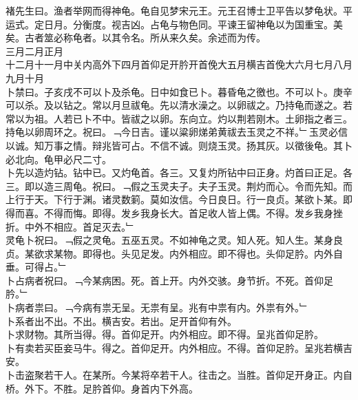 \documentclass{zhvt-classic}
\begin{document}
\hspace*{2em}褚先生曰。渔者举网而得神龟。龟自见梦宋元王。元王召博士卫平告以梦龟状。平运式。定日月。分衡度。视吉凶。占龟与物色同。平谏王留神龟以为国重宝。美矣。古者筮必称龟者。以其令名。所从来久矣。余述而为传。\\
\hspace*{2em}三月二月正月\\
\hspace*{2em}十二月十一月中关内高外下四月首仰足开肣开首俛大五月横吉首俛大六月七月八月九月十月\\
\hspace*{2em}卜禁曰。子亥戌不可以卜及杀龟。日中如食已卜。暮昏龟之徼也。不可以卜。庚辛可以杀。及以钻之。常以月旦祓龟。先以清水澡之。以卵祓之。乃持龟而遂之。若常以为祖。人若已卜不中。皆祓之以卵。东向立。灼以荆若刚木。土卵指之者三。持龟以卵周环之。祝曰。﹁今日吉。谨以粱卵焍弟黄祓去玉灵之不祥。﹂玉灵必信以诚。知万事之情。辩兆皆可占。不信不诚。则烧玉灵。扬其灰。以徵後龟。其卜必北向。龟甲必尺二寸。\\
\hspace*{2em}卜先以造灼钻。钻中已。又灼龟首。各三。又复灼所钻中曰正身。灼首曰正足。各三。即以造三周龟。祝曰。﹁假之玉灵夫子。夫子玉灵。荆灼而心。令而先知。而上行于天。下行于渊。诸灵数箣。莫如汝信。今日良日。行一良贞。某欲卜某。即得而喜。不得而悔。即得。发乡我身长大。首足收人皆上偶。不得。发乡我身挫折。中外不相应。首足灭去。﹂\\
\hspace*{2em}灵龟卜祝曰。﹁假之灵龟。五巫五灵。不如神龟之灵。知人死。知人生。某身良贞。某欲求某物。即得也。头见足发。内外相应。即不得也。头仰足肣。内外自垂。可得占。﹂\\
\hspace*{2em}卜占病者祝曰。﹁今某病困。死。首上开。内外交骇。身节折。不死。首仰足肣。﹂\\
\hspace*{2em}卜病者祟曰。﹁今病有祟无呈。无祟有呈。兆有中祟有内。外祟有外。﹂\\
\hspace*{2em}卜系者出不出。不出。横吉安。若出。足开首仰有外。\\
\hspace*{2em}卜求财物。其所当得。得。首仰足开。内外相应。即不得。呈兆首仰足肣。\\
\hspace*{2em}卜有卖若买臣妾马牛。得之。首仰足开。内外相应。不得。首仰足肣。呈兆若横吉安。\\
\hspace*{2em}卜击盗聚若干人。在某所。今某将卒若干人。往击之。当胜。首仰足开身正。内自桥。外下。不胜。足肣首仰。身首内下外高。\\
\end{document}
